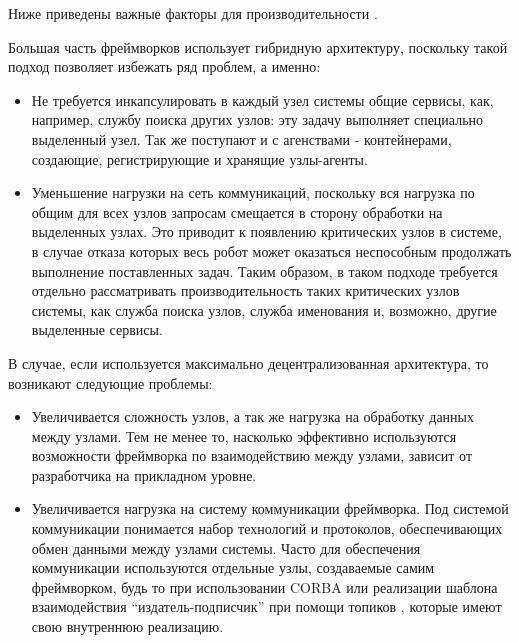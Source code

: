 Ниже приведены важные факторы для производительности \marm{} \cite{blasco2012multiagent}.

\begin{description}[noitemsep]
	
	\item [Тип архитектуры.] Большая часть фреймворков использует гибридную архитектуру, поскольку такой подход позволяет избежать ряд проблем, а именно:
	\begin{itemize}[noitemsep]
		\item Не требуется инкапсулировать в каждый узел системы общие сервисы, как, например, службу поиска других узлов: эту задачу выполняет специально выделенный узел. Так же поступают и с агенствами - контейнерами, создающие, регистрирующие и хранящие узлы-агенты.
		\item Уменьшение нагрузки на сеть коммуникаций, поскольку вся нагрузка по общим для всех узлов запросам смещается в сторону обработки на выделенных узлах. Это приводит к появлению критических узлов в системе, в случае отказа которых весь робот может оказаться неспособным продолжать выполнение поставленных задач. Таким образом, в таком подходе требуется отдельно рассматривать производительность таких критических узлов системы, как служба поиска узлов, служба именования и, возможно, другие выделенные сервисы.
	\end{itemize}
	В случае, если используется максимально децентрализованная архитектура, то возникают следующие проблемы:
	\begin{itemize}[noitemsep]
		\item Увеличивается сложность узлов, а так же нагрузка на обработку данных между узлами. Тем не менее то, насколько эффективно используются возможности фреймворка по взаимодействию между узлами, зависит от разработчика на прикладном уровне.
		\item Увеличивается нагрузка на систему коммуникации фреймворка. Под системой коммуникации понимается набор технологий и протоколов, обеспечивающих обмен данными между узлами системы. Часто для обеспечения коммуникации используются отдельные узлы, создаваемые самим фреймворком, будь то  при использовании CORBA или реализации шаблона взаимодействия \enquote{издатель-подписчик} при помощи топиков , которые имеют свою внутреннюю реализацию.
	\end{itemize}


\end{description}
